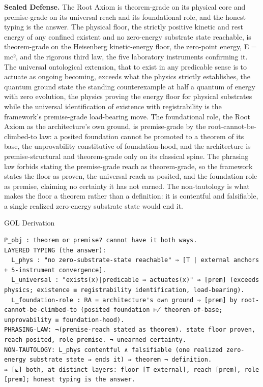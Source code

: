 \documentclass[10pt,twocolumn]{article}
\begin{document}
\textbf{Sealed Defense.} The Root Axiom is theorem-grade on its physical
core and premise-grade on its universal reach and its foundational role,
and the honest typing is the answer. The physical floor, the strictly
positive kinetic and rest energy of any confined existent and no
zero-energy substrate state reachable, is theorem-grade on the
Heisenberg kinetic-energy floor, the zero-point energy, E = mc², and the
rigorous third law, the five laboratory instruments confirming it. The
universal ontological extension, that to exist in any predicable sense
is to actuate as ongoing becoming, exceeds what the physics strictly
establishes, the quantum ground state the standing counterexample at
half a quantum of energy with zero evolution, the physics proving the
energy floor for physical substrates while the universal identification
of existence with registrability is the framework's premise-grade
load-bearing move. The foundational role, the Root Axiom as the
architecture's own ground, is premise-grade by the
root-cannot-be-climbed-to law: a posited foundation cannot be promoted
to a theorem of its base, the unprovability constitutive of
foundation-hood, and the architecture is premise-structural and
theorem-grade only on its classical spine. The phrasing law forbids
stating the premise-grade reach as theorem-grade, so the framework
states the floor as proven, the universal reach as posited, and the
foundation-role as premise, claiming no certainty it has not earned. The
non-tautology is what makes the floor a theorem rather than a
definition: it is contentful and falsifiable, a single realized
zero-energy substrate state would end it.

\begin{golbox}{GOL Derivation}
\begin{lstlisting}[style=golv]
P_obj : theorem or premise? cannot have it both ways.
LAYERED TYPING (the answer):
  L_phys : "no zero-substrate-state reachable" ⇒ [T | external anchors + 5-instrument convergence].
  L_universal : "exists(x)|predicable ⇒ actuates(x)" ⇒ [prem] (exceeds physics; existence ≡ registrability identification, load-bearing).
  L_foundation-role : RA = architecture's own ground ⇒ [prem] by root-cannot-be-climbed-to (posited foundation ⊬ theorem-of-base; unprovability ≡ foundation-hood).
PHRASING-LAW: ¬(premise-reach stated as theorem). state floor proven, reach posited, role premise. ¬ unearned certainty.
NON-TAUTOLOGY: L_phys contentful ∧ falsifiable (one realized zero-energy substrate state ⇒ ends it) ⇒ theorem ¬ definition.
⇒ [⟀] both, at distinct layers: floor [T external], reach [prem], role [prem]; honest typing is the answer.
\end{lstlisting}
\end{golbox}
\end{document}
